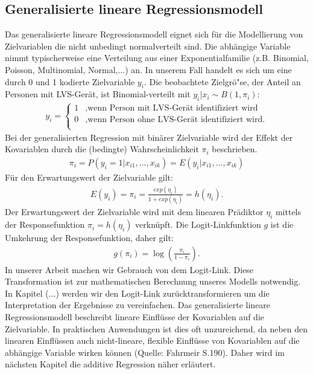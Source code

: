 \subsection{Generalisierte lineare Regressionsmodell}
Das generalisierte lineare Regressionsmodell eignet sich für die Modellierung von Zielvariablen die nicht unbedingt normalverteilt sind. Die abhängige Variable nimmt typischerweise eine Verteilung aus einer Exponentialfamilie (z.B. Binomial, Poisson, Multinomial, Normal,...) an. In unserem Fall handelt es sich um eine durch 0 und 1 kodierte Zielvariable $y_{i}$. Die beobachtete Zielgrö"se, der Anteil an Personen mit LVS-Gerät, ist Binomial-verteilt mit $y_{i}|x_{i}\sim B(1,\pi_{i})$: \\
\begin{align}
y_{i}=\begin{cases}
1 & \text{,wenn Person mit LVS-Gerät identifiziert wird } \\
0 & \text{,wenn Person ohne LVS-Gerät identifiziert wird.} \\
\end{cases}
\end{align}
Bei der generalisierten Regression mit binärer Zielvariable wird der Effekt der Kovariablen durch die (bedingte) Wahrscheinlichkeit $\pi_{i}$ beschrieben.
\begin{align}
\pi_{i}=P(y_{i}=1|x_{i1},...,x_{ik})=E(y_{i}|x_{i1},...,x_{ik})
\end{align}
Für den Erwartungswert der Zielvariable gilt:
\begin{align}
E(y_{i})=\pi_{i}=\frac{exp(\eta_{i})}{1+exp(\eta_{i})}=h(\eta_{i}).
\end{align}
Der Erwartungswert der Zielvariable wird mit dem linearen Prädiktor $\eta_{i}$ mittels der Responsefunktion $\pi_{i}=h(\eta_{i})$ verknüpft. Die Logit-Linkfunktion $g$ ist die Umkehrung der Responsefunktion, daher gilt:
\begin{align}
g(\pi_{i})=\log(\frac{\pi_{i}}{1-\pi_{i}}).
\end{align}
In unserer Arbeit machen wir Gebrauch von dem Logit-Link. Diese Transformation ist zur mathematischen Berechnung unseres Modells notwendig. In Kapitel (...) werden wir den Logit-Link zurücktransformieren um die Interpretation der Ergebnisse zu vereinfachen.
Das generalisierte lineare Regressionsmodell beschreibt lineare Einflüsse der Kovariablen auf die Zielvariable. In praktischen Anwendungen ist dies oft unzureichend, da neben den linearen Einflüssen auch nicht-lineare, flexible Einflüsse von Kovariablen auf die abhängige Variable wirken können (Quelle: Fahrmeir S.190). Daher wird im nächsten Kapitel die additive Regression näher erläutert.
